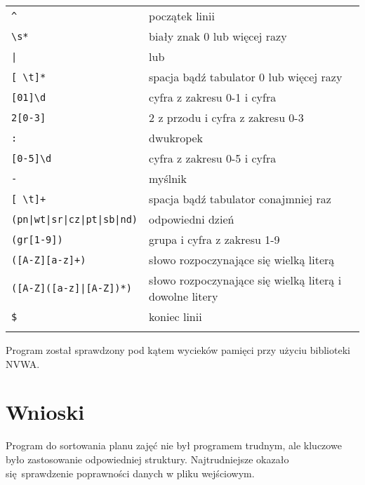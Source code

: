 \documentclass[12pt,a4paper,twoside]{article}
\let\oldmarginpar\marginpar
\renewcommand\marginpar[1]{%
  {\linespread{0.85}\normalfont\scriptsize%
\oldmarginpar[\hspace{1cm}\begin{minipage}{3cm}\raggedleft\scriptsize\color{black}\textsf{#1}\end{minipage}]%
{\hspace{0cm}\begin{minipage}{3cm}\raggedright\scriptsize\color{black}\textsf{#1}\end{minipage}}%
}%
}
\begin{document}
\begin{tabular}{ll}
	\toprule
	\verb/^/                      & początek linii    \\
	\verb/\s*/ 			& biały znak 0 lub więcej razy            \\
	\verb/|/             		& lub         \\
	\verb/[ \t]*/             	& spacja bądź tabulator 0 lub więcej razy         \\
	\verb/[01]\d/               & cyfra z zakresu 0-1 i cyfra  \\
	\verb/2[0-3]/               & 2 z przodu i cyfra z zakresu 0-3            \\
	\verb/:/            		& dwukropek                    \\
	\verb/[0-5]\d/             & cyfra z zakresu 0-5 i cyfra                     \\
	\verb/-/ 			& myślnik \\
	\verb/[ \t]+/		& spacja bądź tabulator conajmniej raz	\\
	\verb/(pn|wt|sr|cz|pt|sb|nd)/         & odpowiedni dzień \\
	\verb/(gr[1-9])/                     	& grupa i cyfra z zakresu 1-9                    \\
	\verb/([A-Z][a-z]+)/ 	& słowo rozpoczynające się wielką literą             \\
	\verb/([A-Z]([a-z]|[A-Z])*)/ 		& słowo rozpoczynające się wielką literą i dowolne litery	\\
	\verb/$/ 			& koniec linii            \\
	\bottomrule
	                            &
\end{tabular}

Program został sprawdzony pod kątem wycieków pamięci przy użyciu biblioteki NVWA.

%



\section{Wnioski}
\marginpar{}
Program do sortowania planu zajęć nie był programem trudnym, ale kluczowe było zastosowanie odpowiedniej struktury. Najtrudniejsze okazało się sprawdzenie poprawności danych w pliku wejściowym. 
\end{document}
